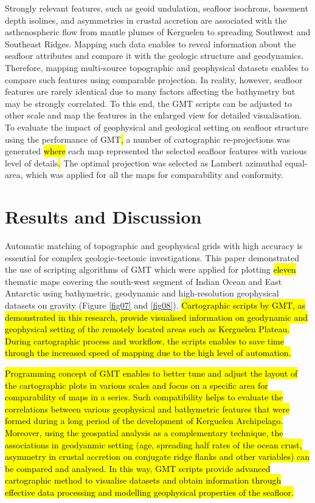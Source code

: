 \documentclass[geomatics,article,submit,pdftex,moreauthors]{Definitions/mdpi}
\begin{document}
Strongly relevant features, such as geoid undulation, seafloor isochrons, basement depth isolines, and asymmetries in crustal accretion are associated with the asthenospheric flow from mantle plumes of Kerguelen to spreading Southwest and Southeast Ridges. Mapping such data enables to reveal information about the seafloor attributes and compare it with the geologic structure and geodynamics. Therefore, mapping multi-source topographic and geophysical datasets enables to compare such features using comparable projection. In reality, however, seafloor features are rarely identical due to many factors affecting the bathymetry but may be strongly correlated. To this end, the GMT scripts can be adjusted to other scale and map the features in the enlarged view for detailed\hl{ }visualisation. To evaluate the impact of geophysical and geological setting on seafloor structure using the performance of GMT\hl{, }a number of cartographic\hl{ }re-projections was generated \hl{where} each map represented the selected seafloor features with various level of details\hl{. }The optimal projection was selected as Lambert azimuthal equal-area, which was applied for all the maps for comparability and conformity.

\section{Results and Discussion}

Automatic matching of topographic and geophysical grids with high accuracy is essential for complex geologic-tectonic investigations. This paper demonstrated the use of scripting algorithms of GMT which were applied for plotting \hl{eleven} thematic maps covering the south-west segment of Indian Ocean and East Antarctic using bathymetric, geodynamic and high-resolution geophysical datasets on gravity (Figure \ref{fig07} and \ref{fig08}). \hl{Cartographic scripts by GMT, as demonstrated in this research, provide visualised information on geodynamic and geophysical setting of the remotely located areas such as Kerguelen Plateau. During cartographic process and workflow, the scripts enables to save time through the increased speed of mapping due to the high level of automation.} 

\hl{Programming concept of GMT enables to better tune and adjust the layout of the cartographic plots in various scales and focus on a specific area for comparability of maps in a series. Such compatibility helps to evaluate the correlations between various geophysical and bathymetric features that were formed during a long period of the development of Kerguelen Archipelago. Moreover, using the geospatial analysis as a complementary technique, the associations in geodyanmic setting (age, spreading half rates of the ocean crust, asymmetry in crustal accretion on conjugate ridge flanks and other variables) can be compared and analysed. In this way, GMT scripts provide advanced cartographic method to visualise datasets and obtain information through effective data processing and modelling geophysical properties of the seafloor.}
\end{document}
